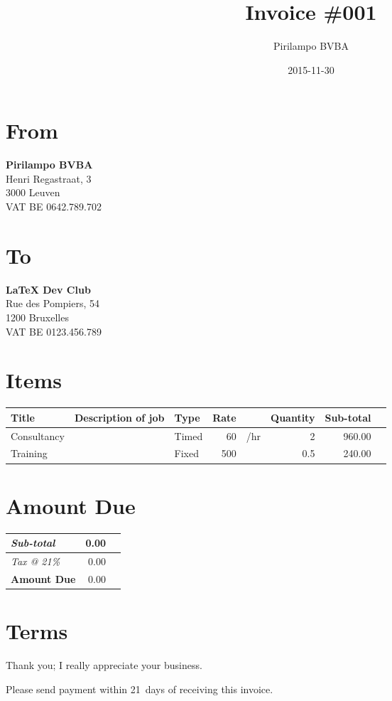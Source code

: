 \documentclass[a4paper]{article}
\author{Pirilampo BVBA}
\date{2015-11-30}
\title{Invoice \#001}
\begin{document}
\maketitle

\section*{From}
\label{sec:orgheadline1}

\textbf{Pirilampo BVBA} \\
Henri Regastraat, 3 \\
3000 Leuven \\
VAT BE 0642.789.702

\section*{To}
\label{sec:orgheadline2}

\textbf{\LaTeX{} Dev Club} \\
Rue des Pompiers, 54 \\
1200 Bruxelles \\
VAT BE 0123.456.789

\vspace*{5ex}{\color{prlp-gray2}\hrule}

\section*{Items}
\label{sec:orgheadline3}

\begin{center}
\label{tab:orgtable1}

\begin{tabular}{lllrlrrl}
Title & Description of job & Type & Rate &  & Quantity & Sub-total & \\
\hline
Consultancy &  & Timed & 60 & \texteuro{}/hr & 2 & 960.00 & \texteuro{}\\
Training &  & Fixed & 500 & \texteuro{} & 0.5 & 240.00 & \texteuro{}\\
\end{tabular}
\end{center}

\section*{Amount Due}
\label{sec:orgheadline4}

\colorbox{prlp-light-gray}{\begin{minipage}{7.5cm}

\begin{center}
\begin{tabu}{Xrl}
\emph{Sub-total} & 0.00 & \texteuro{}\\
\hline
\emph{Tax @ 21\%} & 0.00 & \texteuro{}\\
\hline
\textbf{Amount Due} & 0.00 & \textbf{\texteuro{}}\\
\end{tabu}
\end{center}

\end{minipage}}

\section*{Terms}
\label{sec:orgheadline5}

Thank you; I really appreciate your business.

Please send payment within 21~days of receiving this invoice.

\vfill
\end{document}
